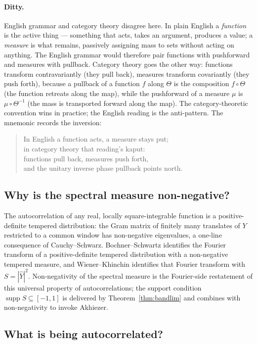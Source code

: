 \documentclass[11pt]{article}
\DeclareMathOperator{\supp}{supp}
\begin{document}
\paragraph{Ditty.}
English grammar and category theory disagree here. In plain English a \emph{function} is the active thing --- something that acts, takes an argument, produces a value; a \emph{measure} is what remains, passively assigning mass to sets without acting on anything. The English grammar would therefore pair functions with pushforward and measures with pullback. Category theory goes the other way: functions transform contravariantly (they pull back), measures transform covariantly (they push forth), because a pullback of a function $f$ along $\Theta$ is the composition $f\circ\Theta$ (the function retreats along the map), while the pushforward of a measure $\mu$ is $\mu\circ\Theta^{-1}$ (the mass is transported forward along the map). The category-theoretic convention wins in practice; the English reading is the anti-pattern. The mnemonic records the inversion:
\begin{quote}
In English a function acts, a measure stays put;\\
in category theory that reading's kaput:\\
functions pull back, measures push forth,\\
and the unitary inverse phase pullback points north.
\end{quote}

\subsection{Why is the spectral measure non-negative?}\label{app:PSD-colloquial}

The autocorrelation of any real, locally square-integrable function is a positive-definite tempered distribution: the Gram matrix of finitely many translates of $Y$ restricted to a common window has non-negative eigenvalues, a one-line consequence of Cauchy--Schwarz. Bochner--Schwartz identifies the Fourier transform of a positive-definite tempered distribution with a non-negative tempered measure, and Wiener--Khinchin identifies that Fourier transform with $S=|\widehat{Y}|^2$. Non-negativity of the spectral measure is the Fourier-side restatement of this universal property of autocorrelations; the support condition $\supp S\subseteq[-1,1]$ is delivered by Theorem~\ref{thm:bandlim} and combines with non-negativity to invoke Akhiezer.

\subsection{What is being autocorrelated?}\label{app:autocorr}
\end{document}
